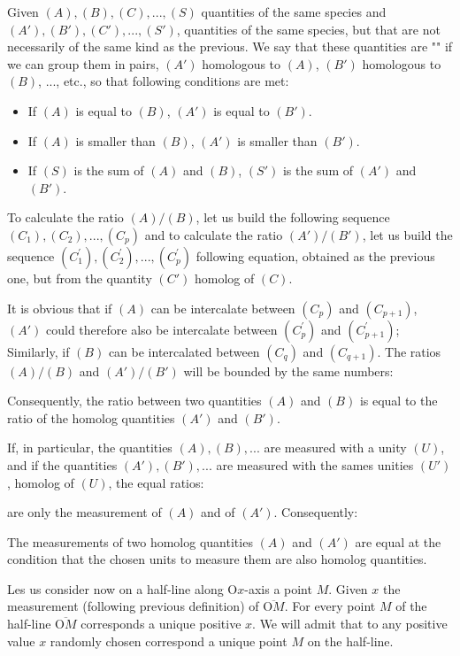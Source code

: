 	Given $(A), (B), (C), ..., (S)$ quantities of the same species and $(A'), (B'), (C'), ..., (S ')$, quantities of the same species, but that are not necessarily of the same kind as the previous. We say that these quantities are "" if we can group them in pairs, $(A ')$ homologous to $(A)$, $(B')$ homologous to $(B)$, ..., etc., so that following conditions are met:
	\begin{itemize}
		\item If $(A)$ is equal to $(B)$, $(A')$ is equal to $(B')$.
		\item If $(A)$ is smaller than $(B)$, $(A')$ is smaller than $(B')$.
		\item If $(S)$ is the sum of $(A)$ and $(B)$, $(S')$ is the sum of $(A')$ and $(B')$.
	\end{itemize}
	To calculate the ratio $(A) / (B)$, let us build the following sequence $(C_1),(C_2),...,(C_p)$ and to calculate the ratio $(A')/(B')$, let us build the sequence  $(C_1^{'}),(C_2^{'}),...,(C_p^{'})$ following equation, obtained as the previous one, but from the quantity $(C ')$ homolog of $(C)$.
	
	It is obvious that if $(A)$ can be intercalate between $(C_p)$ and $(C_{p+1})$, $(A')$ could therefore also be intercalate between $(C_p^{'})$ and $(C_{p+1}^{'})$; Similarly, if $(B)$ can be intercalated between $(C_q)$ and $(C_{q+1})$. The ratios $(A) / (B)$ and $(A ') / (B')$ will be bounded by the same numbers:
		
	Consequently, the ratio between two quantities $(A)$ and $(B)$ is equal to the ratio of the homolog quantities $(A')$ and $(B')$.

	If, in particular, the quantities $(A),(B),...$ are measured with a unity $(U)$, and if the quantities $(A'),(B'),...$ are measured with the sames unities $(U')$, homolog of $(U)$, the equal ratios:
	
	are only the measurement of $(A)$ and of $(A')$. Consequently:
	
	The measurements of two homolog quantities $(A)$ and $(A')$ are equal at the condition that the chosen units to measure them are also homolog quantities.

	Les us consider now on a half-line along $\text{O}x$-axis a point $M$. Given $x$ the measurement (following previous definition) of $\overline{\text{O}M}$. For every point $M$ of the half-line $\overline{\text{O}M}$ corresponds a unique positive $x$. We will admit that to any positive value $x$ randomly chosen correspond a unique point $M$ on the half-line.
	
